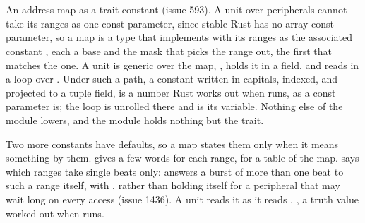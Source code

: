 \section{}
\label{sec:r-map}

An address map as a trait constant (issue 593). A unit over 
peripherals cannot take its  ranges as one const parameter,
since stable Rust has no array const parameter, so a map is a type
that implements  with its ranges as the associated
constant , each a base and the mask
that picks the range out, the first that matches the one. A unit is
generic over the map, , holds it in a
 field, and reads  in a loop
over . Under \code{\#[lower]} such a path, a constant
written in capitals, indexed, and projected to a tuple field, is a
number Rust works out when  runs, as a const parameter
is; the loop is unrolled there and  is its variable. Nothing
else of the module lowers, and the module holds nothing but the
trait.

Two more constants have defaults, so a map states them only when it
means something by them.  gives a few words for each
range, for a table of the map.  says which ranges take
single beats only:  answers a burst of more than one
beat to such a range itself, with , rather than holding
itself for a peripheral that may wait long on every access (issue
1436). A unit reads it as it reads , ,
a truth value worked out when  runs.


